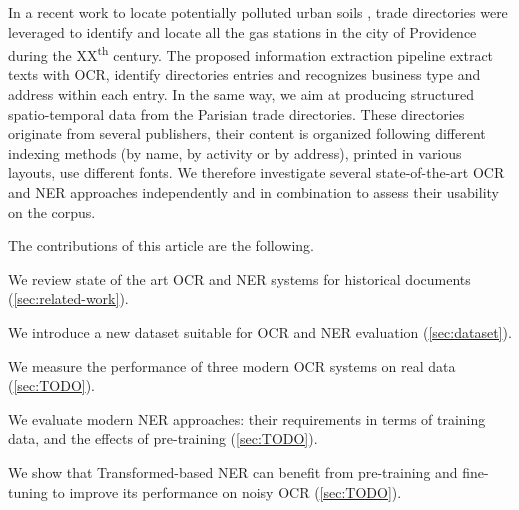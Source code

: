 In a recent work to locate potentially polluted urban soils \cite{bell2020automated}, trade directories were leveraged to identify and locate all the gas stations in the city of Providence during the XX\textsuperscript{th} century.
The proposed information extraction pipeline extract texts with OCR, identify directories entries and recognizes business type and address within each entry.
In the same way, we aim at producing structured spatio-temporal data from the Parisian trade directories.
These directories originate from several publishers, their content is organized following different indexing methods (by name, by activity or by address), printed in various layouts, use different fonts.
We therefore investigate several state-of-the-art OCR and NER approaches independently and in combination to assess their usability on the corpus.

The contributions of this article are the following. 
\begin{enumerate*}[(i)]
    \item We review state of the art OCR and NER systems for historical documents (\cref{sec:related-work}).
    \item We introduce a new dataset suitable for OCR and NER evaluation (\cref{sec:dataset}).
    \item We measure the performance of three modern OCR systems on real data (\cref{sec:TODO}).
    \item We evaluate modern NER approaches: their requirements in terms of training data, and the effects of pre-training (\cref{sec:TODO}).
    \item We show that Transformed-based NER can benefit from pre-training and fine-tuning to improve its performance on noisy OCR (\cref{sec:TODO}).
\end{enumerate*}


